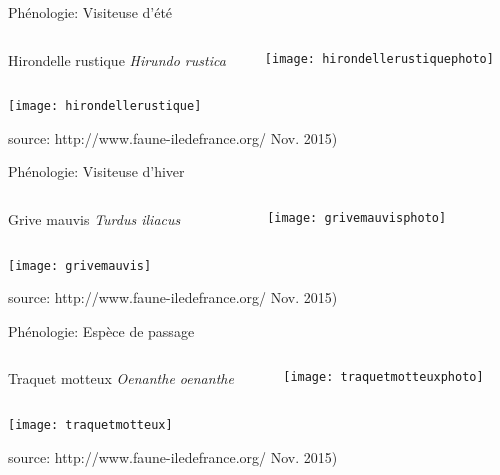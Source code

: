 \documentclass[10pt]{beamer}
\begin{document}
\begin{frame}{Phénologie: Visiteuse d'été}
 \begin{columns}
    \begin{column}[c]{0.7\textwidth}
   Hirondelle rustique \textit{Hirundo rustica}
    \end{column}
    \begin{column}[c]{0.30\textwidth}
     \begin{center}
        \texttt{[image: hirondellerustiquephoto]}
  \end{center}
    \end{column}
  \end{columns}
    \begin{center}
        \texttt{[image: hirondellerustique]}
  \end{center}
  \footnotesize{source: http://www.faune-iledefrance.org/ Nov. 2015)}
\end{frame}


\begin{frame}{Phénologie: Visiteuse d'hiver}
 \begin{columns}
    \begin{column}[c]{0.7\textwidth}
   Grive mauvis \textit{Turdus iliacus}
    \end{column}
    \begin{column}[c]{0.30\textwidth}
     \begin{center}
        \texttt{[image: grivemauvisphoto]}
  \end{center}
    \end{column}
  \end{columns}
    \begin{center}
        \texttt{[image: grivemauvis]}
  \end{center}
  \footnotesize{source: http://www.faune-iledefrance.org/ Nov. 2015)}
\end{frame}



\begin{frame}{Phénologie: Espèce de passage}
 \begin{columns}
    \begin{column}[c]{0.7\textwidth}
   Traquet motteux \textit{Oenanthe oenanthe}
    \end{column}
    \begin{column}[c]{0.30\textwidth}
     \begin{center}
        \texttt{[image: traquetmotteuxphoto]}
  \end{center}
    \end{column}
  \end{columns}
    \begin{center}
        \texttt{[image: traquetmotteux]}
  \end{center}
  \footnotesize{source: http://www.faune-iledefrance.org/ Nov. 2015)}
\end{frame}
\end{document}

